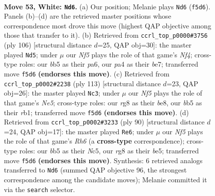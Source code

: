 \documentclass[11pt]{article}
\begin{document}
\clearpage

\begin{figure}[p]\centering
\begin{subfigure}{0.46\textwidth}\centering
\resizebox{\linewidth}{!}{%
\newchessgame
\chessboard[
  setfen={5kr1/8/8/1b2pN2/pP4P1/R3K3/8/8 w - - 5 53},
  showmover=false,
  pgfstyle=straightmove, color=movearrow, markmove={f5-d6}
]}
\caption{}
\end{subfigure}\hfill
\begin{subfigure}{0.46\textwidth}\centering
\resizebox{\linewidth}{!}{%
\newchessgame
\chessboard[
  setfen={4k3/1p2b2R/p7/8/5N2/1P4PK/1r6/8 w - - 3 54},
  showmover=false,
  pgfstyle=straightmove, color=movearrow, markmove={f4-d5}
]}
\caption{}
\end{subfigure}
\\[4pt]
\begin{subfigure}{0.46\textwidth}\centering
\resizebox{\linewidth}{!}{%
\newchessgame
\chessboard[
  setfen={4B3/8/8/r3k1pp/P3n3/8/6KP/1R6 b - - 5 57},
  showmover=false,
  pgfstyle=straightmove, color=movearrow, markmove={e4-c3}
]}
\caption{}
\end{subfigure}\hfill
\begin{subfigure}{0.46\textwidth}\centering
\resizebox{\linewidth}{!}{%
\newchessgame
\chessboard[
  setfen={8/2k5/7R/1pN1b3/3p4/6PK/1P1r4/8 w - - 7 46},
  showmover=false,
  pgfstyle=straightmove, color=movearrow, markmove={h6-e6}
]}
\caption{}
\end{subfigure}
\caption{\textbf{Move 53, White: \texttt{Nd6}.} (a) Our position; Melanie plays \texttt{Nd6} (\texttt{f5d6}). Panels (b)--(d) are the retrieved master positions whose correspondence most drove this move (highest QAP objective among those that transfer to it). (b) Retrieved from \texttt{ccrl\_top\_p0000\#3756} (ply 106) [structural distance $d$=25, QAP obj=30]: the master played \texttt{Nd5}; under $\mu$ our \emph{Nf5} plays the role of that game's \emph{Nf4}; cross-type roles: our \emph{b}b5 as their \emph{p}a6, our \emph{p}a4 as their \emph{b}e7; transferred move \texttt{f5d6} \textbf{(endorses this move)}. (c) Retrieved from \texttt{ccrl\_top\_p0002\#2238} (ply 113) [structural distance $d$=23, QAP obj=26]: the master played \texttt{Nc3}; under $\mu$ our \emph{Nf5} plays the role of that game's \emph{Ne5}; cross-type roles: our \emph{r}g8 as their \emph{b}e8, our \emph{b}b5 as their \emph{r}b1; transferred move \texttt{f5d6} \textbf{(endorses this move)}. (d) Retrieved from \texttt{ccrl\_top\_p0002\#3233} (ply 90) [structural distance $d$=24, QAP obj=17]: the master played \texttt{Re6}; under $\mu$ our \emph{Nf5} plays the role of that game's \emph{Rh6} (a \textbf{cross-type} correspondence); cross-type roles: our \emph{b}b5 as their \emph{N}c5, our \emph{r}g8 as their \emph{b}e5; transferred move \texttt{f5d6} \textbf{(endorses this move)}. Synthesis: 6 retrieved analogs transferred to \texttt{Nd6} (summed QAP objective 96, the strongest correspondence among the candidate moves); Melanie committed it via the \texttt{search} selector.}
\label{fig:thought-m104}
\end{figure}
\end{document}
